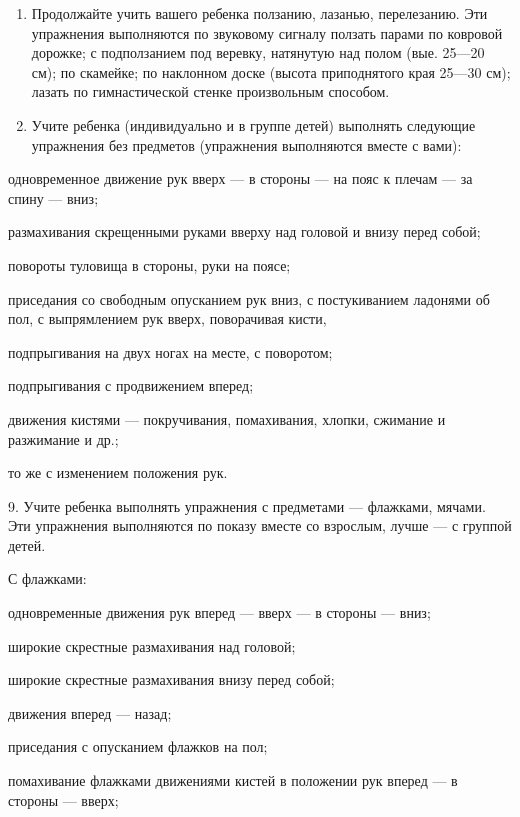 \documentclass{book}
\begin{document}
\begin{enumerate}
\def\labelenumi{\arabic{enumi}.}
\setcounter{enumi}{6}
\item
  
  Продолжайте учить вашего ребенка ползанию, лазанью, перелезанию. Эти
  упражнения выполняются по звуковому сигналу ползать парами по ковровой
  дорожке; с подползанием под веревку, натянутую над полом (вые. 25---20
  см); по скамейке; по наклонном доске (высота приподнятого края 25---30
  см); лазать по гимнастической стенке произвольным способом.
  
\item
  
  Учите ребенка (индивидуально и в группе детей) выполнять следующие
  упражнения без предметов (упражнения выполняются вместе с вами):
  
\end{enumerate}


одновременное движение рук вверх --- в стороны --- на пояс к плечам ---
за спину --- вниз;

размахивания скрещенными руками вверху над головой и внизу перед собой;

повороты туловища в стороны, руки на поясе;

приседания со свободным опусканием рук вниз, с постукиванием ладонями об
пол, с выпрямлением рук вверх, поворачивая кисти,

подпрыгивания на двух ногах на месте, с поворотом;

подпрыгивания с продвижением вперед;

движения кистями --- покручивания, помахивания, хлопки, сжимание и
разжимание и др.;

то же с изменением положения рук.

9. Учите ребенка выполнять упражнения с предметами --- флажками, мячами.
Эти упражнения выполняются по показу вместе со взрослым, лучше --- с
группой детей.

С флажками:

одновременные движения рук вперед --- вверх --- в стороны --- вниз;

широкие скрестные размахивания над головой;

широкие скрестные размахивания внизу перед собой;

движения вперед --- назад;

приседания с опусканием флажков на пол;

помахивание флажками движениями кистей в положении рук вперед --- в
стороны --- вверх;
\end{document}
